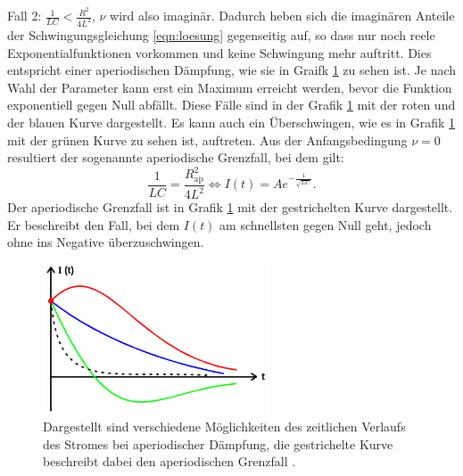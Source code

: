Fall 2: $\frac{1}{L C} < \frac{R^2}{4L^2}$, $\nu$ wird also imaginär. Dadurch heben
sich die imaginären Anteile der Schwingungsgleichung \eqref{eqn:loesung} gegenseitig
auf, so dass nur noch reele Exponentialfunktionen vorkommen und keine Schwingung
mehr auftritt. Dies entspricht einer aperiodischen Dämpfung, wie sie in Graifk
\ref{fig:ap_grenzfall} zu sehen ist. Je nach Wahl der Parameter kann erst ein Maximum
erreicht werden, bevor die Funktion exponentiell gegen Null abfällt. Diese Fälle
sind in der Grafik \ref{fig:ap_grenzfall} mit der roten und der blauen Kurve
dargestellt. Es kann auch ein Überschwingen, wie es in Grafik \ref{fig:ap_grenzfall}
mit der grünen Kurve zu sehen ist, auftreten.
Aus der Anfangsbedingung $\nu=0$ resultiert der sogenannte aperiodische Grenzfall,
bei dem gilt:
\begin{equation}
  \frac{1}{L C} = \frac{R_{\text{ap}}^2}{4 L^2} \iff I(t) = A e^{-\frac{1}{\sqrt{L C}}}.
  \label{eqn:bedingung-ap-grenzfall}
\end{equation}
Der aperiodische Grenzfall ist in Grafik \ref{fig:ap_grenzfall} mit der gestrichelten
Kurve dargestellt. Er beschreibt den Fall, bei dem $I(t)$ am schnellsten gegen Null
geht, jedoch ohne ins Negative überzuschwingen.
\begin{figure}
  \centering
  \includegraphics[width=0.6\textwidth]{ap_grenzfall.png}
  \caption{Dargestellt sind verschiedene Möglichkeiten des zeitlichen Verlaufs des
  Stromes bei aperiodischer Dämpfung, die gestrichelte Kurve beschreibt dabei den
  aperiodischen Grenzfall \cite{sample}.}
  \label{fig:ap_grenzfall}
\end{figure}


